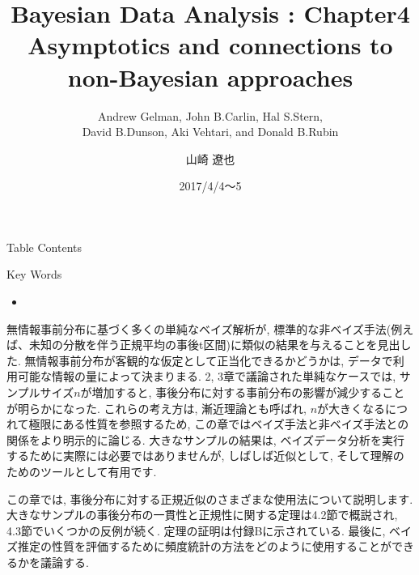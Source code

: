 \documentclass[10pt,dvipdfmx,a4]{beamer}
\title{Bayesian Data Analysis : Chapter4 \\Asymptotics and connections to non-Bayesian approaches}
\subtitle{Andrew Gelman, John B.Carlin, Hal S.Stern,\\David B.Dunson, Aki Vehtari, and Donald B.Rubin}
\author{山崎 遼也}
\institute{情報学科 数理工学コース 4回}
\date{2017/4/4～5}
\begin{document}
\frame{\titlepage}

\begin{frame}{Table Contents}
\begin{multicols}{2}
{\scriptsize \tableofcontents}
\end{multicols}
\end{frame}

\begin{frame}{Key Words}
\begin{multicols}{2}
{\scriptsize \begin{itemize}
\item 
\end{itemize}}
\end{multicols}
\end{frame}


\begin{frame}
無情報事前分布に基づく多くの単純なベイズ解析が, 標準的な非ベイズ手法(例えば、未知の分散を伴う正規平均の事後t区間)に類似の結果を与えることを見出した.
無情報事前分布が客観的な仮定として正当化できるかどうかは, データで利用可能な情報の量によって決まりまる.
2, 3章で議論された単純なケースでは, サンプルサイズ$n$が増加すると, 事後分布に対する事前分布の影響が減少することが明らかになった.
これらの考え方は, 漸近理論とも呼ばれ, $n$が大きくなるにつれて極限にある性質を参照するため, この章ではベイズ手法と非ベイズ手法との関係をより明示的に論じる.
大きなサンプルの結果は, ベイズデータ分析を実行するために実際には必要ではありませんが, しばしば近似として, そして理解のためのツールとして有用です.

この章では, 事後分布に対する正規近似のさまざまな使用法について説明します.
大きなサンプルの事後分布の一貫性と正規性に関する定理は4.2節で概説され, 4.3節でいくつかの反例が続く.
定理の証明は付録Bに示されている.
最後に, ベイズ推定の性質を評価するために頻度統計の方法をどのように使用することができるかを議論する.
\end{frame}

\end{document}
